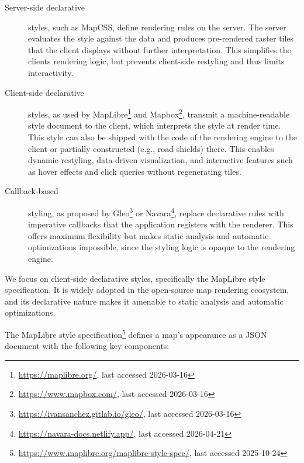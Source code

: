 \begin{description}
    \item[Server-side declarative] styles, such as MapCSS, define rendering rules on the server.
    The server evaluates the style against the data and produces pre-rendered raster tiles that the client displays without further interpretation.
    This simplifies the clients rendering logic, but prevents client-side restyling and thus limits interactivity.

    \item[Client-side declarative] \begin{sloppypar} styles, as used by MapLibre\footnote{\url{https://maplibre.org/}, last accessed 2026-03-16} and Mapbox\footnote{\url{https://www.mapbox.com/}, last accessed 2026-03-16}, transmit a machine-readable style document to the client, which interprets the style at render time.
    This style can also be shipped with the code of the rendering engine to the client or partially constructed (e.g., road shields) there.
    This enables dynamic restyling, data-driven visualization, and interactive features such as hover effects and click queries without regenerating tiles.\end{sloppypar}

    \item[Callback-based] styling, as proposed by Gleo\footnote{\url{https://ivansanchez.gitlab.io/gleo/}, last accessed 2026-03-16} or Navara\footnote{\url{https://navara-docs.netlify.app/}, last accessed 2026-04-21}, replace declarative rules with imperative callbacks that the application registers with the renderer.
    This offers maximum flexibility but makes static analysis and automatic optimizations impossible, since the styling logic is opaque to the rendering engine.
\end{description}

We focus on client-side declarative styles, specifically the MapLibre style specification.
It is widely adopted in the open-source map rendering ecosystem, and its declarative nature makes it amenable to static analysis and automatic optimizations.

The MapLibre style specification\footnote{\url{https://www.maplibre.org/maplibre-style-spec/}, last accessed 2025-10-24} defines a map's appearance as a \ac{JSON} document with the following key components:

